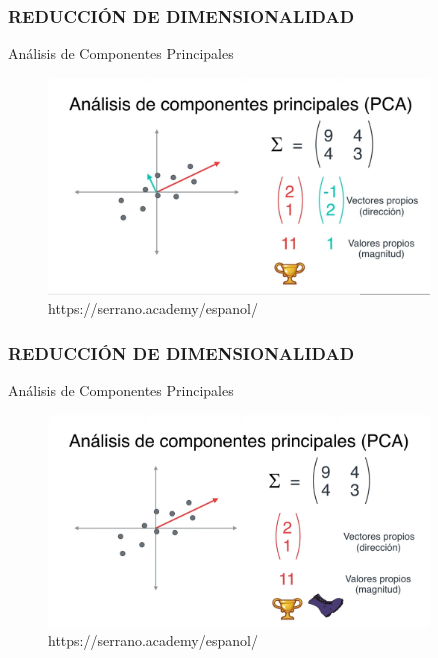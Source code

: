 \documentclass{beamer}
\begin{document}
\begin{frame}
	\frametitle{REDUCCIÓN DE DIMENSIONALIDAD}
	\begin{block}{Análisis de Componentes Principales}	
		\begin{figure}
			\includegraphics[width=0.9\textwidth]{PCA/IMG_3584.jpg}
			\caption{https://serrano.academy/espanol/}
		\end{figure}
	\end{block}
\end{frame}

\begin{frame}
	\frametitle{REDUCCIÓN DE DIMENSIONALIDAD}
	\begin{block}{Análisis de Componentes Principales}	
		\begin{figure}
			\includegraphics[width=0.9\textwidth]{PCA/IMG_3585.jpg}
			\caption{https://serrano.academy/espanol/}
		\end{figure}
	\end{block}
\end{frame}
\end{document}
